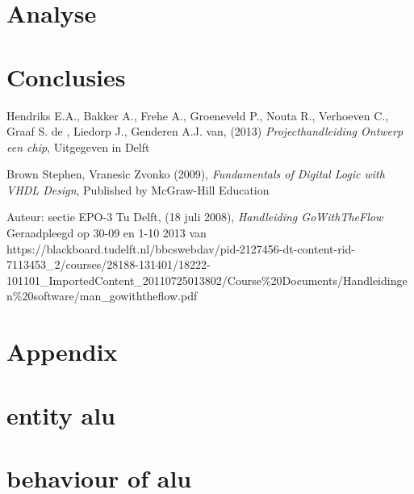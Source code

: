 \documentclass[11pt,twoside,a4paper]{article}
\begin{document}
\section{Analyse}


\section{Conclusies}





\newpage
\begin{thebibliography}{7} %
%
Hendriks E.A., Bakker A., Frehe A., Groeneveld P., Nouta R., Verhoeven C., Graaf S. de , Liedorp J., Genderen A.J. van,  (2013) \textit{Projecthandleiding Ontwerp een chip}, Uitgegeven in Delft

Brown Stephen, Vranesic Zvonko (2009), \textit{Fundamentals of Digital Logic with VHDL Design}, Published by McGraw-Hill Education


Auteur: sectie EPO-3 Tu Delft, (18 juli 2008), \textit{Handleiding GoWithTheFlow } Geraadpleegd op 30-09 en 1-10 2013 van https://blackboard.tudelft.nl/bbcswebdav/pid-2127456-dt-content-rid-7113453\_2/courses/28188-131401/18222-101101\_ImportedContent\_20110725013802/Course\%20Documents/Handleidingen\%20software/man\_gowiththeflow.pdf



\end{thebibliography}





\scriptsize
\newpage

\section{Appendix}


\appendix
\section{entity alu}
\label{entity}



\section{behaviour of alu}
\label{behaviour}

\end{document}
